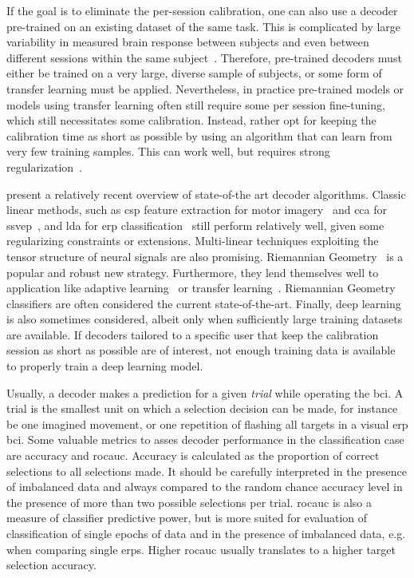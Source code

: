 
If the goal is to eliminate the per-session calibration, one can also use a
decoder pre-trained on an existing dataset of the same task.
This is complicated by large variability in measured brain response between subjects
and even between different sessions within the same
subject~\cite{Guger2009,Saha2020}.
Therefore, pre-trained decoders must either be trained on a very large, diverse
sample of subjects, or some form of transfer learning must be applied.
Nevertheless, in practice pre-trained models or models using transfer learning often still
require some per session fine-tuning, which still necessitates some
calibration.
Instead, rather opt for keeping the calibration time as short as possible by using
an algorithm that can learn from very few training samples.
This can work well, but requires strong regularization~\cite{VanDenKerchove2022}.

\textcite{Lotte2018, Xu2021} present a relatively recent overview of state-of-the art
decoder algorithms.
Classic linear methods, such as \ac{csp} feature extraction for
motor imagery~\cite{Park2017} and \ac{cca} for \ac{ssvep}~\cite{Nakanishi2017},
and \ac{lda} for \ac{erp} classification~\cite{Sosulski2022} still perform
relatively well, given some regularizing constraints or extensions.
Multi-linear techniques exploiting the tensor structure of neural signals are
also promising.
Riemannian Geometry~\cite{Barachant2014} is a popular and robust new strategy.
Furthermore, they lend themselves well to application like adaptive
learning~\cite{Benaroch2021} or transfer learning~\cite{Zanini2017}.
Riemannian Geometry classifiers are often considered the current
state-of-the-art.
Finally, deep learning~\cite{Bhuvaneshwari2021} is also sometimes considered,
albeit only when sufficiently large training datasets are available.
If decoders tailored to a specific user that keep the calibration session as
short as possible are of interest, not enough training data is available to
properly train a deep learning model.

Usually, a decoder makes a prediction for a given \emph{trial} while operating
the \ac{bci}.
A trial is the smallest unit on which a selection decision can be made, for
instance be one imagined movement, or one repetition of flashing all targets
in a visual \ac{erp} \ac{bci}.
Some valuable metrics to asses decoder performance in the classification case
are accuracy and \ac{rocauc}.
Accuracy is calculated as the proportion of correct selections to all
selections made.
It should be carefully interpreted in the presence of imbalanced data and always compared to the
random chance accuracy level in the presence of more than two possible
selections per trial.
\Ac{rocauc} is also a measure of classifier predictive power, but is more
suited for evaluation of classification of single epochs of data and in the
presence of imbalanced data, e.g. when comparing single \acp{erp}.
Higher \ac{rocauc} usually translates to a higher target selection accuracy.

